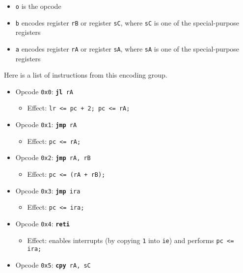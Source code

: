 \documentclass{article}
\begin{document}
	\singlespacing
	\begin{itemize}
	\item \texttt{o} is the opcode
	\item \texttt{b} encodes register \texttt{rB} or register
	\texttt{sC}, where \texttt{sC} is one of the special-purpose registers
	\item \texttt{a} encodes register \texttt{rA} or register
	\texttt{sA}, where \texttt{sA} is one of the special-purpose registers
	\end{itemize}
	\doublespacing

	Here is a list of instructions from this encoding group.

	\singlespacing
	\begin{itemize}
	\item Opcode \texttt{0x0}:
		\texttt{\textbf{jl} rA}
		\begin{itemize}
		\item Effect: \texttt{lr <= pc + 2; pc <= rA;}
		\end{itemize}
	\item Opcode \texttt{0x1}:
		\texttt{\textbf{jmp} rA}
		\begin{itemize}
		\item Effect: \texttt{pc <= rA;}
		\end{itemize}
	\item Opcode \texttt{0x2}:
		\texttt{\textbf{jmp} rA, rB}
		\begin{itemize}
		\item Effect: \texttt{pc <= (rA + rB);}
		\end{itemize}
	\item Opcode \texttt{0x3}:
		\texttt{\textbf{jmp} ira}
		\begin{itemize}
		\item Effect: \texttt{pc <= ira;}
		\end{itemize}
	\item Opcode \texttt{0x4}:
		\texttt{\textbf{reti}}
		\begin{itemize}
		\item Effect: enables interrupts (by copying \texttt{1} into
		\texttt{ie}) and performs \texttt{pc <= ira;}
		\end{itemize}
	\item Opcode \texttt{0x5}:
		\texttt{\textbf{cpy} rA, sC}
		\begin{itemize}

\end{itemize}
\end{itemize}
\end{document}
